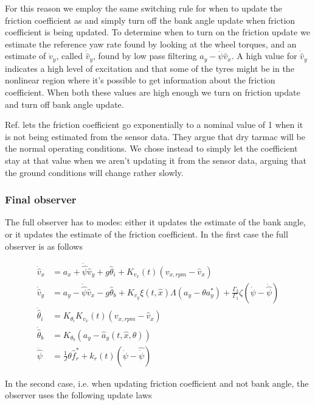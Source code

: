 For this reason we employ the same switching rule for when to update the friction coefficient as \cite{MainStateEst} and simply turn off the bank angle update when friction coefficient is being updated. To determine when to turn on the friction update we estimate the reference yaw rate found by looking at the wheel torques, and an estimate of $\dot{v}_y$, called $\dot{\hat{v}}_y$, found by low pass filtering $a_y - \dot{\psi}\hat{v}_x$. A high value for $\dot{\hat{v}}_y$ indicates a high level of excitation and that some of the tyres might be in the nonlinear region where it's possible to get information about the friction coefficient. When both these values are high enough we turn on friction update and turn off bank angle update. 

Ref. \cite{MainStateEst} lets the friction coefficient go exponentially to a nominal value of 1 when it is not being estimated from the sensor data. They argue that dry tarmac will be the normal operating conditions. We chose instead to simply let the coefficient stay at that value when we aren't updating it from the sensor data, arguing that the ground conditions will change rather slowly.

\subsubsection{Final observer}
The full observer has to modes: either it updates the estimate of the bank angle, or it updates the estimate of the friction coefficient. In the first case the full observer is as follows

\begin{align}
    \dot{\hat{v}}_x & = a_x + \dot{\hat{\psi}}\hat{v}_y + g\hat{\theta}_i + K_{v_x}(t)(v_{x,rpm} - \hat{v}_x) \\
    \dot{\hat{v}}_y & = a_y - \dot{\hat{\psi}}\hat{v}_x - g\hat{\theta}_b + K_{v_y}\xi(t,\hat{x})\Lambda(a_y - \theta a_y^{*}) + \frac{\Gamma_2}{\Gamma_1}\zeta(\dot{\psi} - \dot{\hat{\psi}}) \\ 
    \dot{\hat{\theta}}_i & = K_{\theta_i}K_{v_x}(t)(v_{x,rpm} - \hat{v}_x) \\
    \dot{\hat{\theta}}_b & = K_{\theta_b}(a_y-\hat{a}_y(t,\hat{x},\theta)) \\ 
    \ddot{\hat{\psi}} & = \frac{1}{J}\theta \hat{f}_r^* + k_r(t)(\dot{\psi}-\hat{\dot{\psi}})
\end{align}

In the second case, i.e. when updating friction coefficient and not bank angle, the observer uses the following update laws

